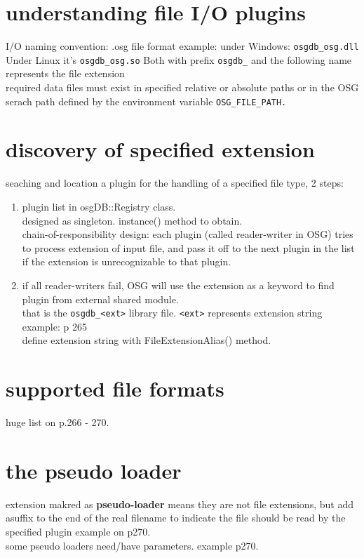 \documentclass[a4paper,12pt]{book}
\begin{document}
\section{understanding file I/O plugins}
I/O naming convention: .osg file format example: under Windows: \verb|osgdb_osg.dll| Under Linux it's \verb|osgdb_osg.so| Both with prefix \verb|osgdb_| and the following name represents the file extension\\
required data files must exist in specified relative or absolute paths or in the OSG serach path defined by the environment variable \verb|OSG_FILE_PATH.|\\

\section{discovery of specified extension}
seaching and location a plugin for the handling of a specified file type, 2 steps:

\begin{enumerate}
\item plugin list in osgDB::Registry class.\\
designed as singleton. instance() method to obtain.\\
chain-of-responsibility design: each plugin (called reader-writer in OSG) tries to process extension of input file, and pass it off to the next plugin in the list if the extension is unrecognizable to that plugin.\\

\item if all reader-writers fail, OSG will use the extension as a keyword to find plugin from external shared module.\\
that is the \verb|osgdb_<ext>| library file. \verb|<ext>| represents extension string example: p 265\\
define extension string with FileExtensionAlias() method.\\

\end{enumerate}

\section{supported file formats}
huge list on p.266 - 270.

\section{the pseudo loader}
extension makred as \textbf{pseudo-loader} means they are not file extensions, but add asuffix to the end of the real filename to indicate the file should be read by the specified plugin example on p270.\\
some pseudo loaders need/have parameters. example p270.
\end{document}
